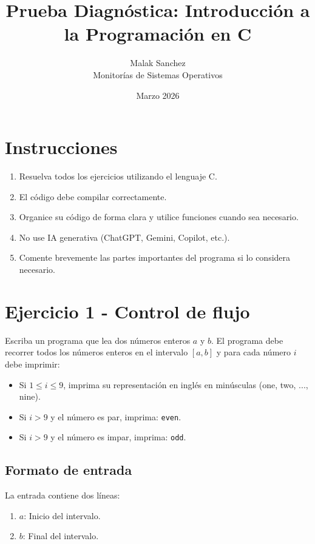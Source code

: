 \documentclass[12pt,a4paper]{article}
\title{\huge Prueba Diagnóstica: Introducción a la Programación en C}
\author{Malak Sanchez \\ \small Monitorías de Sistemas Operativos}
\date{Marzo 2026}
\begin{document}
\maketitle

\section*{Instrucciones}
\begin{enumerate}
    \item Resuelva todos los ejercicios utilizando el lenguaje C.
    \item El código debe compilar correctamente.
    \item Organice su código de forma clara y utilice funciones cuando sea necesario.
    \item No use IA generativa (ChatGPT, Gemini, Copilot, etc.).
    \item Comente brevemente las partes importantes del programa si lo considera necesario.
\end{enumerate}
\newpage

\section*{Ejercicio 1 - Control de flujo}

Escriba un programa que lea dos números enteros $a$ y $b$. El programa debe recorrer todos los números enteros en el intervalo $[a, b]$ y para cada número $i$ debe imprimir:

\begin{itemize}
    \item Si $1 \le i \le 9$, imprima su representación en inglés en minúsculas (one, two, ..., nine).
    \item Si $i > 9$ y el número es par, imprima: \texttt{even}.
    \item Si $i > 9$ y el número es impar, imprima: \texttt{odd}.
\end{itemize}

\subsection*{Formato de entrada}
La entrada contiene dos líneas:
\begin{enumerate}
    \item $a$: Inicio del intervalo.
    \item $b$: Final del intervalo.
\end{enumerate}
\end{document}
